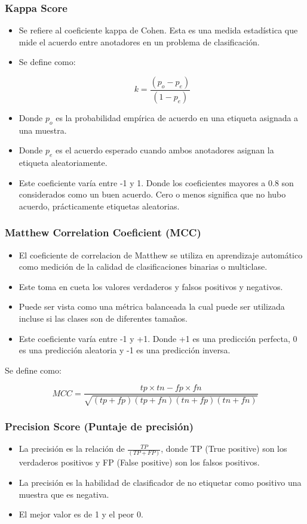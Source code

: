 \subsubsection{Kappa Score} \par
\begin{itemize}
    \item Se refiere al coeficiente kappa de Cohen. Esta es una medida estadística que mide el acuerdo entre anotadores en un problema de clasificación.
    \item Se define como:\par
    $$ k = \frac{(p_{o} - p_{e})}{(1- p_{e})}$$
    \item Donde $p_{o}$ es la probabilidad empírica de acuerdo en una etiqueta asignada a una muestra.
    \item Donde $p_{e}$ es el acuerdo esperado cuando ambos anotadores asignan la etiqueta aleatoriamente.
    \item Este coeficiente varía entre -1 y 1. Donde los coeficientes mayores a 0.8 son considerados como un buen acuerdo. Cero o menos significa que no hubo acuerdo, prácticamente etiquetas aleatorias.
\end{itemize}

\subsubsection{Matthew Correlation Coeficient (MCC)} \par
\begin{itemize}
    \item El coeficiente de correlacion de Matthew se utiliza en aprendizaje automático como medición de la calidad de clasificaciones binarias o multiclase.
    \item Este toma en cueta los valores verdaderos y falsos positivos y negativos.
    \item Puede ser vista como una métrica balanceada la cual puede ser utilizada incluse si las clases son de diferentes tamaños.
    \item Este coeficiente varía entre -1 y +1. Donde +1 es una predicción perfecta, 0 es una predicción aleatoria y -1 es una predicción inversa.
\end{itemize}
Se define como: \par
    $$ MCC = \frac{tp \times tn - fp \times fn}{\sqrt{(tp+fp)(tp+fn)(tn+fp)(tn+fn)}}$$


\subsubsection{ Precision Score (Puntaje de precisión)} \par
\begin{itemize}
    \item La precisión es la relación de $\frac{TP}{(TP + FP)}$, donde TP (True positive) son los verdaderos positivos y FP (False positive) son los falsos positivos.
    \item La precisión es la habilidad de clasificador de no etiquetar como positivo una muestra que es negativa. 
    \item El mejor valor es de 1 y el peor 0.
\end{itemize}

